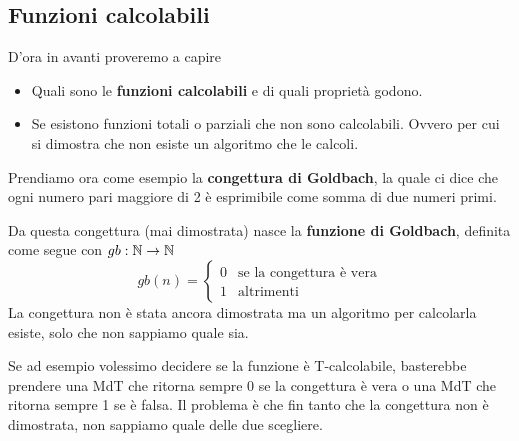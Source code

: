 \subsection{Funzioni calcolabili}
D'ora in avanti proveremo a capire
\begin{itemize}
	\item Quali sono le \textbf{funzioni calcolabili} e di
	      quali proprietà godono.
	\item Se esistono funzioni totali o parziali che non sono
	      calcolabili. Ovvero per cui si dimostra che non esiste
	      un algoritmo che le calcoli.
\end{itemize}

\begin{example}
	Prendiamo ora come esempio la
	\textbf{congettura di Goldbach}, la quale ci dice che ogni
	numero pari maggiore di 2 è esprimibile come somma di due
	numeri primi.

	Da questa congettura (mai dimostrata) nasce la
	\textbf{funzione di Goldbach}, definita come segue con
	$gb : \mathbb{N} \to \mathbb{N}$
	\[
		gb(n) = \begin{cases}
			0 & \text{se la congettura è vera} \\
			1 & \text{altrimenti}
		\end{cases}
	\]
	La congettura non è stata ancora dimostrata ma un algoritmo
	per calcolarla esiste, solo che non sappiamo quale sia.

	Se ad esempio volessimo decidere se la funzione è
	T-calcolabile, basterebbe prendere una MdT che ritorna
	sempre 0 se la congettura è vera o una MdT che ritorna
	sempre 1 se è falsa. Il problema è che fin tanto che la
	congettura non è dimostrata, non sappiamo quale delle due
	scegliere.
\end{example}


